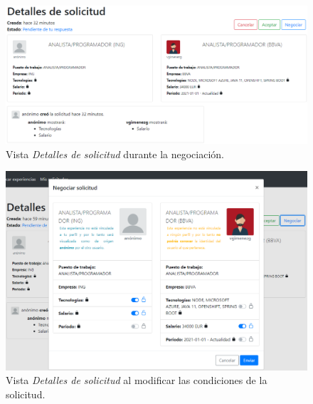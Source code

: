 \documentclass[a4paper, 12pt]{book}
\begin{document}
    \begin{figure}
        \centering
        \includegraphics[width=15cm, keepaspectratio]{img/negotiation_details_buttons.PNG}
        \caption{Vista \emph{Detalles de solicitud} durante la negociación.}\label{fig:negotiation_details_buttons}
    \end{figure}

    \begin{figure}
        \centering
        \includegraphics[width=15cm, keepaspectratio]{img/negotiation_details_modal.PNG}
        \caption{Vista \emph{Detalles de solicitud} al modificar las condiciones de la solicitud.}\label{fig:negotiation_details_modal}
    \end{figure}
\end{document}
